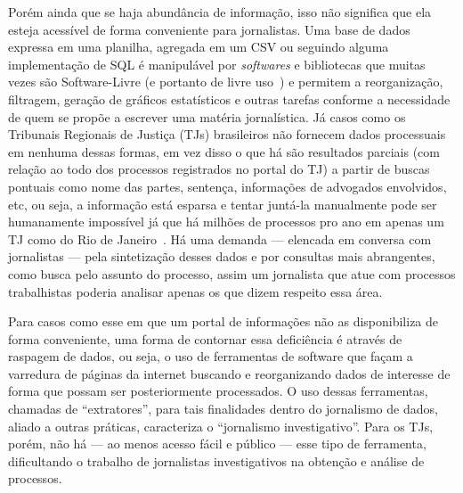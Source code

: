 Porém ainda que se haja abundância de informação, isso não significa que ela
esteja acessível de forma conveniente para jornalistas. Uma base de dados
expressa em uma planilha, agregada em um CSV ou seguindo alguma implementação
de SQL é manipulável por \textit{softwares} e bibliotecas que muitas vezes são
Software-Livre (e portanto de livre uso~\cite{def:free-software}) e permitem a
reorganização, filtragem, geração de gráficos estatísticos e outras tarefas
conforme a necessidade de quem se propõe a escrever uma matéria jornalística.
Já casos como os Tribunais Regionais de Justiça (TJs) brasileiros não fornecem
dados processuais em nenhuma dessas formas, em vez disso o que há são
resultados parciais (com relação ao todo dos processos registrados no portal do
TJ) a partir de buscas pontuais como nome das partes, sentença, informações de
advogados envolvidos, etc, ou seja, a informação está esparsa e tentar juntá-la
manualmente pode ser humanamente impossível já que há milhões de processos pro
ano em apenas um TJ como do Rio de Janeiro~\cite{tjrj}. Há uma demanda ---
elencada em conversa com jornalistas --- pela sintetização desses dados e por
consultas mais abrangentes, como busca pelo assunto do processo, assim um
jornalista que atue com processos trabalhistas poderia analisar apenas os que
dizem respeito essa área.

Para casos como esse em que um portal de informações não as disponibiliza de
forma conveniente, uma forma de contornar essa deficiência é através de
raspagem de dados, ou seja, o uso de ferramentas de software que façam a
varredura de páginas da internet buscando e reorganizando dados de interesse de
forma que possam ser posteriormente processados. O uso dessas ferramentas,
chamadas de ``extratores'', para tais finalidades dentro do jornalismo de
dados, aliado a outras práticas, caracteriza o ``jornalismo investigativo''.
Para os TJs, porém, não há --- ao menos acesso fácil e público --- esse tipo de
ferramenta, dificultando o trabalho de jornalistas investigativos na obtenção e
análise de processos.
